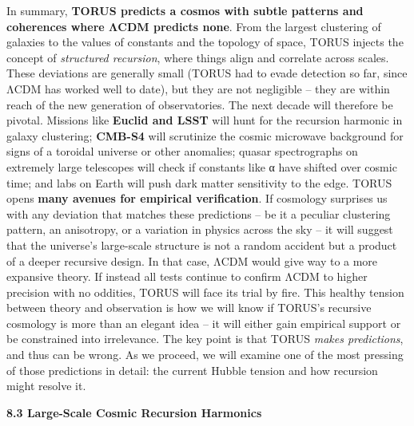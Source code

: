 \documentclass[
]{article}
\begin{document}
In summary, \textbf{TORUS predicts a cosmos with subtle patterns and
coherences where ΛCDM predicts none}. From the largest clustering of
galaxies to the values of constants and the topology of space, TORUS
injects the concept of \emph{structured recursion}, where things align
and correlate across scales. These deviations are generally small (TORUS
had to evade detection so far, since ΛCDM has worked well to date), but
they are not negligible -- they are within reach of the new generation
of observatories. The next decade will therefore be pivotal. Missions
like \textbf{Euclid and LSST} will hunt for the recursion harmonic in
galaxy clustering; \textbf{CMB-S4} will scrutinize the cosmic microwave
background for signs of a toroidal universe or other
anomalies\hspace{0pt}; quasar spectrographs on extremely large
telescopes will check if constants like α have shifted over cosmic
time\hspace{0pt}; and labs on Earth will push dark matter sensitivity to
the edge. TORUS opens \textbf{many avenues for empirical
verification}\hspace{0pt}. If cosmology surprises us with any deviation
that matches these predictions -- be it a peculiar clustering pattern,
an anisotropy, or a variation in physics across the sky -- it will
suggest that the universe's large-scale structure is not a random
accident but a product of a deeper recursive design. In that case, ΛCDM
would give way to a more expansive theory. If instead all tests continue
to confirm ΛCDM to higher precision with no oddities, TORUS will face
its trial by fire. This healthy tension between theory and observation
is how we will know if TORUS's recursive cosmology is more than an
elegant idea -- it will either gain empirical support or be constrained
into irrelevance. The key point is that TORUS \emph{makes predictions},
and thus can be wrong. As we proceed, we will examine one of the most
pressing of those predictions in detail: the current Hubble tension and
how recursion might resolve it.

\textbf{8.3 Large-Scale Cosmic Recursion Harmonics}
\end{document}
